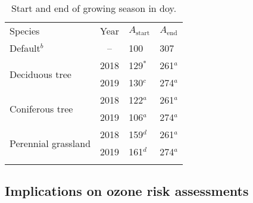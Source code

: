 \documentclass[bg, manuscript]{copernicus}
\begin{document}
\begin{table}[t]
  \caption{Start and end of growing season in \unit{doy}.}
  \label{tab:sensitivity_tests_gs}
  \begin{tabular}{lcll}
    \tophline
    Species & Year & $A_\mathrm{start}$ & $A_\mathrm{end}$\\
    \middlehline
    Default$^b$ & -- & 100 & 307\\
    \multirow{2}{*}{Deciduous tree} & 2018 & 129$^*$ & 261$^a$ \\
    & 2019 & 130$^c$ & 274$^a$ \\
    \multirow{2}{*}{Coniferous tree} & 2018 & 122$^a$ & 261$^a$ \\
    & 2019 & 106$^a$ & 274$^a$ \\
    \multirow{2}{*}{Perennial grassland} & 2018 & 159$^d$ & 261$^a$\\
    & 2019 & 161$^d$ & 274$^a$ \\
    \bottomhline
  \end{tabular}
\end{table}


\subsection{Implications on ozone risk assessments}
\label{subsec:do3se_results}
\end{document}
